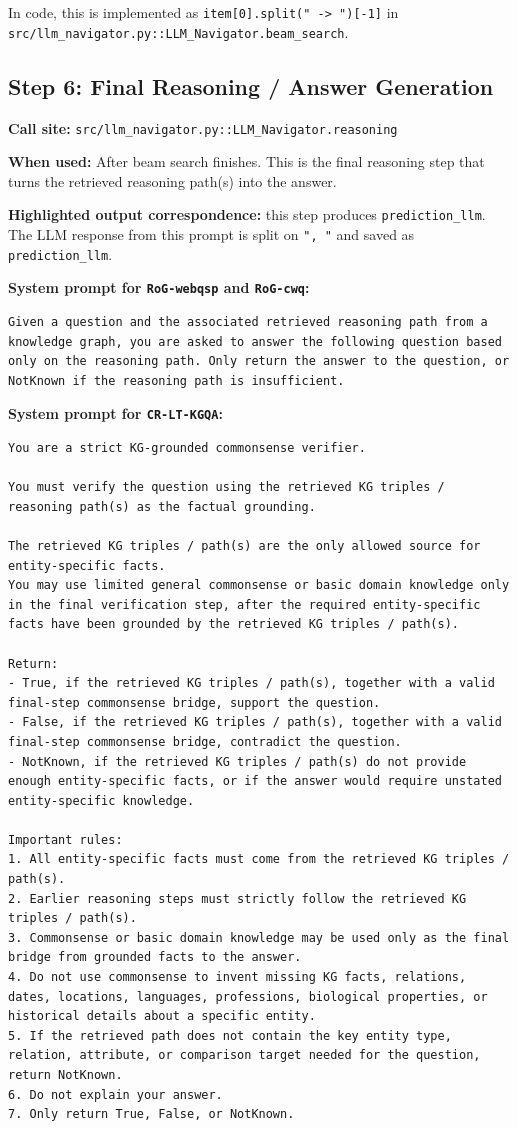 \documentclass[11pt]{article}
\begin{document}
In code, this is implemented as
\texttt{item[0].split(" -> ")[-1]} in
\texttt{src/llm\_navigator.py::LLM\_Navigator.beam\_search}.

\subsection{Step 6: Final Reasoning / Answer Generation}

\textbf{Call site:} \texttt{src/llm\_navigator.py::LLM\_Navigator.reasoning}

\textbf{When used:} After beam search finishes. This is the final reasoning step
that turns the retrieved reasoning path(s) into the answer.

\textbf{Highlighted output correspondence:} this step produces
\texttt{prediction\_llm}. The LLM response from this prompt is split on
\texttt{", "} and saved as \texttt{prediction\_llm}.

\textbf{System prompt for \texttt{RoG-webqsp} and \texttt{RoG-cwq}:}
\begin{lstlisting}[style=prompt]
Given a question and the associated retrieved reasoning path from a knowledge graph, you are asked to answer the following question based only on the reasoning path. Only return the answer to the question, or NotKnown if the reasoning path is insufficient.
\end{lstlisting}

\textbf{System prompt for \texttt{CR-LT-KGQA}:}
\begin{lstlisting}[style=prompt]
You are a strict KG-grounded commonsense verifier.

You must verify the question using the retrieved KG triples / reasoning path(s) as the factual grounding.

The retrieved KG triples / path(s) are the only allowed source for entity-specific facts.
You may use limited general commonsense or basic domain knowledge only in the final verification step, after the required entity-specific facts have been grounded by the retrieved KG triples / path(s).

Return:
- True, if the retrieved KG triples / path(s), together with a valid final-step commonsense bridge, support the question.
- False, if the retrieved KG triples / path(s), together with a valid final-step commonsense bridge, contradict the question.
- NotKnown, if the retrieved KG triples / path(s) do not provide enough entity-specific facts, or if the answer would require unstated entity-specific knowledge.

Important rules:
1. All entity-specific facts must come from the retrieved KG triples / path(s).
2. Earlier reasoning steps must strictly follow the retrieved KG triples / path(s).
3. Commonsense or basic domain knowledge may be used only as the final bridge from grounded facts to the answer.
4. Do not use commonsense to invent missing KG facts, relations, dates, locations, languages, professions, biological properties, or historical details about a specific entity.
5. If the retrieved path does not contain the key entity type, relation, attribute, or comparison target needed for the question, return NotKnown.
6. Do not explain your answer.
7. Only return True, False, or NotKnown.
\end{lstlisting}
\end{document}
